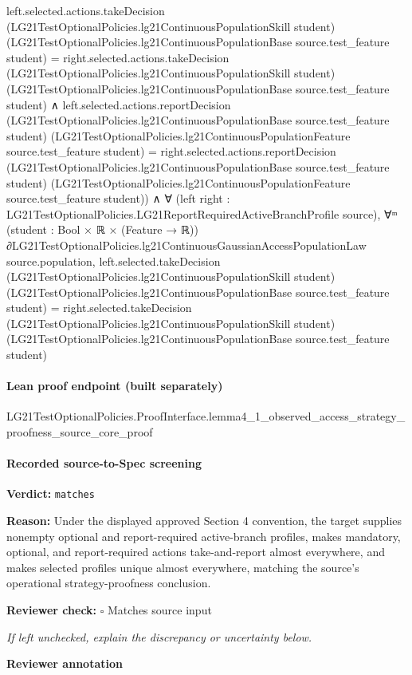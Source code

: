 \documentclass[10pt]{article}
\newcommand{\reviewerbox}{%
  \par\noindent\fbox{\parbox{0.96\linewidth}{\rule{0pt}{0.38in}}}\par
}
\newcommand{\reviewmatch}[1]{%
  \par\noindent\textbf{Reviewer check:} $\square$\; #1\par
  \noindent\emph{If left unchecked, explain the discrepancy or uncertainty below.}\par
}
\begin{document}
\begin{ReviewVerbatim}
                left.selected.actions.takeDecision (LG21TestOptionalPolicies.lg21ContinuousPopulationSkill student)
                      (LG21TestOptionalPolicies.lg21ContinuousPopulationBase source.test_feature student) =
                    right.selected.actions.takeDecision (LG21TestOptionalPolicies.lg21ContinuousPopulationSkill student)
                      (LG21TestOptionalPolicies.lg21ContinuousPopulationBase source.test_feature student) ∧
                  left.selected.actions.reportDecision
                      (LG21TestOptionalPolicies.lg21ContinuousPopulationBase source.test_feature student)
                      (LG21TestOptionalPolicies.lg21ContinuousPopulationFeature source.test_feature student) =
                    right.selected.actions.reportDecision
                      (LG21TestOptionalPolicies.lg21ContinuousPopulationBase source.test_feature student)
                      (LG21TestOptionalPolicies.lg21ContinuousPopulationFeature source.test_feature student)) ∧
            ∀ (left right : LG21TestOptionalPolicies.LG21ReportRequiredActiveBranchProfile source),
              ∀ᵐ (student :
                Bool ×
                  ℝ ×
                    (Feature →
                      ℝ)) ∂LG21TestOptionalPolicies.lg21ContinuousGaussianAccessPopulationLaw source.population,
                left.selected.takeDecision (LG21TestOptionalPolicies.lg21ContinuousPopulationSkill student)
                    (LG21TestOptionalPolicies.lg21ContinuousPopulationBase source.test_feature student) =
                  right.selected.takeDecision (LG21TestOptionalPolicies.lg21ContinuousPopulationSkill student)
                    (LG21TestOptionalPolicies.lg21ContinuousPopulationBase source.test_feature student)
\end{ReviewVerbatim}

\paragraph{Lean proof endpoint (built separately)}\begin{ReviewVerbatim}
LG21TestOptionalPolicies.ProofInterface.lemma4_1_observed_access_strategy_proofness_source_core_proof
\end{ReviewVerbatim}

\paragraph{Recorded source-to-Spec screening}
\textbf{Verdict:} \texttt{matches}
\\
{\raggedright
\textbf{Reason:} Under the displayed approved Section 4 convention, the target supplies nonempty optional and report-\allowbreak{}required active-\allowbreak{}branch profiles, makes mandatory, optional, and report-\allowbreak{}required actions take-\allowbreak{}and-\allowbreak{}report almost everywhere, and makes selected profiles unique almost everywhere, matching the source's operational strategy-\allowbreak{}proofness conclusion.\allowbreak{}
\par}
\reviewmatch{Matches source input}
\noindent\textbf{Reviewer annotation}\par
\reviewerbox
\clearpage
\hypertarget{source-claim-967753ba3a07fa47}{}
\end{document}

